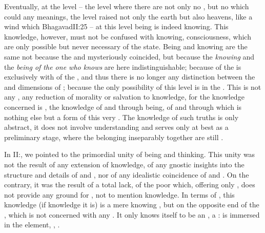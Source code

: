 Eventually, at the  level -- the level where there are not only no
, but no  which could  any
 meanings, the level raised not only  the earth but also
 heavens, like a wind which   \citet{invisible [...] to mortal eyes, beyond
  thought and beyond change}{Bhagavad}{II:25} -- at this level being is indeed
knowing.  This knowledge, however, must not be confused with 
knowing,  consciousness, which are only possible but never
necessary  of the  state. Being and knowing are
the same not because the  and  mysteriously
coincided, but because the {\em knowing} and the {\em being of the one who
  knows} are here indistinguishable; because  of the 
is  exclusively with  of the , and
thus there is no longer any distinction between the  and
 dimensions of ; because the only possibility of
this level is  in the .   This is not any
, any reduction of morality or salvation to knowledge, for
the knowledge concerned is , the knowledge of and through being, of
and through  which is nothing else but a  form of
this very . The  knowledge of such truths is only
abstract, it does not involve understanding and serves only at best as a
preliminary stage, where the  belonging inseparably together are
still .

In II:, we pointed to the primordial  unity
of being and thinking. This unity was not the result of any extension of
 knowledge, of any gnostic insights into the structure and details of
 and , nor of any idealistic coincidence of 
and . On the contrary, it was the result of a total lack, of the
poor  which, offering only , does not provide any
ground for , not to mention  knowledge.  In terms of
, this knowledge (if knowledge it is) is a mere knowing ,
but  on the opposite end of the 
,  which is not concerned with any . It
only knows itself to be an , a :  is immersed in the  element, , .

